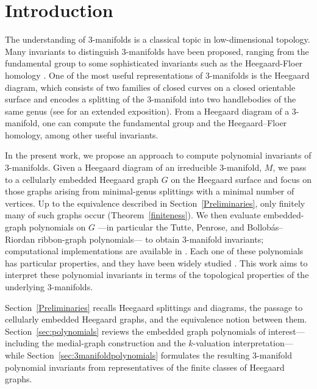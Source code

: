 \documentclass[pdflatex,sn-mathphys-num]{sn-jnl}%
\theoremstyle{plain}
\theoremstyle{definition}
\theoremstyle{remark}
\begin{document}
\maketitle

\section{Introduction}\label{sec:intro}

The understanding of $3$-manifolds is a classical topic in low-dimensional topology. Many invariants to distinguish $3$-manifolds have been proposed, ranging from the fundamental group to some sophisticated invariants such as the Heegaard-Floer homology \cite{OS}. One of the most useful representations of $3$-manifolds is the Heegaard diagram, which consists of two families of closed curves on a closed orientable surface and encodes a splitting of the 3-manifold into two handlebodies of the same genus (see \cite{Hempel1976} for an extended exposition). From a Heegaard diagram of a $3$-manifold, one can compute the fundamental group and the Heegaard–Floer homology, among other useful invariants.

In the present work, we propose an approach to compute polynomial invariants of $3$-manifolds. Given a Heegaard diagram of an irreducible $3$-manifold, $M$, we pass to a cellularly embedded Heegaard graph $G$ on the Heegaard surface and focus on those graphs arising from minimal-genus splittings with a minimal number of vertices. Up to the equivalence described in Section~\ref{Preliminaries}, only finitely many of such graphs occur (Theorem~\ref{finiteness}). We then evaluate embedded-graph polynomials on $G$ ---in particular the Tutte, Penrose, and Bollobás–Riordan ribbon-graph polynomials--- to obtain $3$-manifold invariants; computational implementations are available in \cite{FG}. Each one of these polynomials has particular properties, and they have been widely studied \cite{EMM}. This work aims to interpret these polynomial invariants in terms of the topological properties of the underlying $3$-manifolds.

Section~\ref{Preliminaries} recalls Heegaard splittings and diagrams, the passage to cellularly embedded Heegaard graphs, and the equivalence notion between them. Section~\ref{sec:polynomials} reviews the embedded graph polynomials of interest---including the medial-graph construction and the $k$-valuation interpretation---while Section~\ref{sec:3manifoldpolynomials} formulates the resulting $3$-manifold polynomial invariants from representatives of the finite classes of Heegaard graphs.
\end{document}
